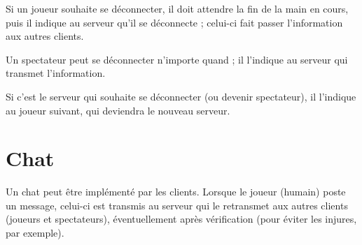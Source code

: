Si un joueur souhaite se déconnecter, il doit attendre la fin de la main en cours, puis il indique au serveur qu'il se déconnecte ; celui-ci fait passer l'information aux autres clients.

Un spectateur peut se déconnecter n'importe quand ; il l'indique au serveur qui transmet l'information.

Si c'est le serveur qui souhaite se déconnecter (ou devenir spectateur), il l'indique au joueur suivant, qui deviendra le nouveau serveur.

\section{Chat}

Un chat peut être implémenté par les clients.
Lorsque le joueur (humain) poste un message, celui-ci est transmis au serveur qui le retransmet aux autres clients (joueurs et spectateurs), éventuellement après vérification (pour éviter les injures, par exemple).
